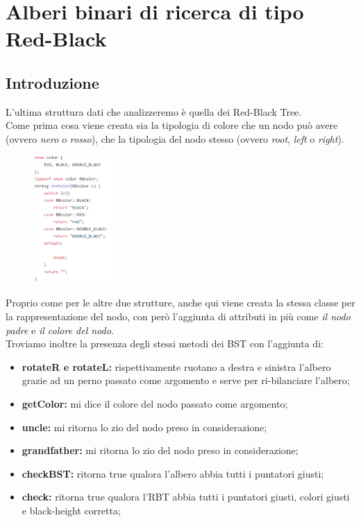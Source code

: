 \documentclass[a4paper]{article}
\begin{document}
		\newpage
		
		\section{Alberi binari di ricerca di tipo Red-Black}
			\subsection{Introduzione}
			L'ultima struttura dati che analizzeremo è quella dei Red-Black Tree.\\
			Come prima cosa viene creata sia la tipologia di colore che un nodo può avere (ovvero \textit{nero} o \textit{rosso}), che la tipologia del nodo stesso (ovvero \textit{root}, \textit{left} o \textit{right}).\\
			\begin{figure}[ht]
				\includegraphics[width=3cm]{Enum}
			\end{figure}
			Proprio come per le altre due strutture, anche qui viene creata la stessa classe per la rappresentazione del nodo, con però l'aggiunta di attributi in più come \textit{il nodo padre} e \textit{il colore del nodo}.\\
			Troviamo inoltre la presenza degli stessi metodi dei BST con l'aggiunta di:
			\begin{itemize}
				\item \textbf{rotateR e rotateL:} rispettivamente ruotano a destra e sinistra l'albero grazie ad un perno passato come argomento e serve per ri-bilanciare l'albero;
				\item \textbf{getColor:} mi dice il colore del nodo passato come argomento;
				\item \textbf{uncle:} mi ritorna lo zio del nodo preso in considerazione;
				\item \textbf{grandfather:} mi ritorna lo zio del nodo preso in considerazione;
				\item \textbf{checkBST:} ritorna true qualora l'albero abbia tutti i puntatori giusti;
				\item \textbf{check:} ritorna true qualora l'RBT abbia tutti i puntatori giusti, colori giusti e black-height corretta;
			\end{itemize}
			
\end{document}
